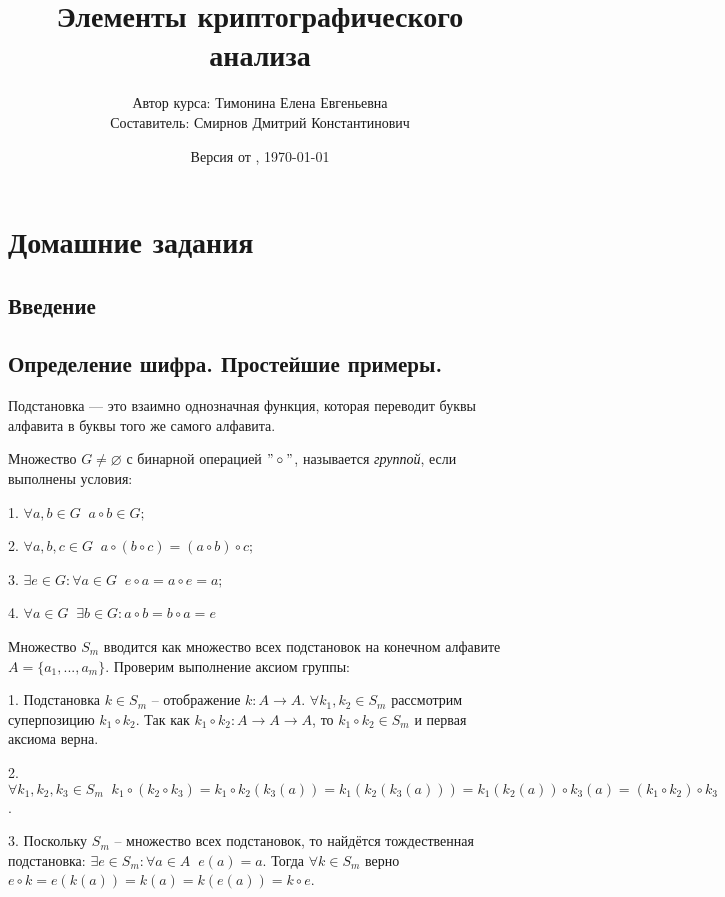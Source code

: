 \documentclass[letterpaper,11pt,openany]{book}
\title{Элементы криптографического анализа}
\author{Автор курса: Тимонина Елена Евгеньевна \\ 
		Составитель: Смирнов Дмитрий Константинович }
\date{Версия от \currenttime, \today}
\begin{document}
\maketitle
\tableofcontents

\mainmatter

\chapter{Домашние задания}

\section{Введение}

\section{Определение шифра. Простейшие примеры.}

Подстановка — это взаимно однозначная функция, которая переводит буквы алфавита в буквы того же самого алфавита.

Множество $G \ne \varnothing$ с бинарной операцией $"\circ"$, называется \emph{группой}, если выполнены условия:

1. $ \forall a,b \in G \;\; a \circ b \in G; $

2. $ \forall a,b,c \in G \;\; a \circ (b \circ c) = (a \circ b) \circ c; $

3. $ \exists e \in G \colon \forall a \in G \;\; e \circ a = a \circ e = a;$

4. $ \forall a \in G \;\; \exists b \in G \colon a \circ b = b \circ a = e$

Множество $S_m$ вводится как множество всех подстановок на конечном алфавите $A = \{a_1, ... , a_m\} $. Проверим выполнение аксиом группы:

1. Подстановка $k \in S_m$ -- отображение $k \colon A \to A$. $\forall k_1, k_2 \in S_m $ рассмотрим суперпозицию $k_1 \circ k_2$. Так как $k_1 \circ k_2 \colon A \to A \to A$, то $k_1 \circ k_2 \in S_m $ и первая аксиома верна.

2. $\forall k_1, k_2, k_3 \in S_m \;\; k_1 \circ (k_2 \circ k_3) = k_1 \circ k_2 ( k_3 (a)) = k_1 ( k_2 ( k_3 (a))) = k_1 ( k_2 (a)) \circ k_3 (a) = (k_1 \circ k_2) \circ k_3$.

3. Поскольку $S_m$ -- множество всех подстановок, то найдётся тождественная подстановка: $\exists e \in S_m \colon \forall a \in A \;\; e(a) = a$. Тогда $\forall k \in S_m $ верно $e \circ k = e(k(a)) = k(a) = k(e(a)) = k \circ e$.
\end{document}
